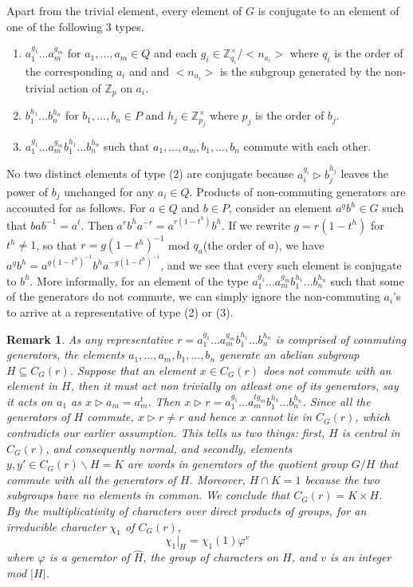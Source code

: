 \documentclass[11pt]{book}
\theoremstyle{Rem}
\newtheorem{Rem}[theorem]{Remark}
\theoremstyle{definition}
\numberwithin{equation}{section}
\newcommand\hit{\triangleright}
\newcommand\inv{^{-1}}
\newcommand\ZZ{\mathbb Z}
\newcommand{\qb}{q_a}
\begin{document}
Apart from the trivial element, every element of $G$ is conjugate to an element of one of the following 3 types.\begin{enumerate}
\item $a_1^{g_1}\dots a_m^{g_m}$ for $a_1,\dots , a_m\in Q$ and each $g_i \in \ZZ_{q_i}^\times/<n_{a_i}> $ where $q_i$ is the order of the corresponding $a_i$ and and $<n_{a_i}>$ is the subgroup generated by the non-trivial action of $\ZZ_p$ on $a_i$.
\item $ b_1^{h_1}\dots b_n^{h_n} $ for $b_1,\dots , b_n\in P$ and $h_j \in \ZZ_{p_j}^\times$ where $p_j$ is the order of $b_j$. 
\item $ a_1^{g_1}\dots a_m^{g_m}b_1^{h_1}\dots b_n^{h_n} $ such that $a_1,\dots , a_m, b_1,\dots , b_n $ commute with each other. \end{enumerate}
No two distinct elements of type (2) are conjugate because $a_i^{g_i}\hit b_j^{h_j}$ leaves the power of $b_j$ unchanged for any $a_i \in Q$. Products of non-commuting generators are accounted for as follows. For $a \in Q$ and $b\in P$, consider an element $a^gb^h \in G$ such that $bab\inv = a^t$. Then $a^rb^ha^{-r} = a^{r(1-t^h)}b^h$. If we rewrite $g= r(1-t^h)$ for $t^h\neq 1$, so that $r =g(1-t^h)\inv$ mod $\qb$(the order of $a$), we have $a^gb^h = a^{g(1-t^h)\inv}b^ha^{-g(1-t^h)\inv}$, and we see that every such element is conjugate to $b^h$. More informally, for an element of the type $ a_1^{g_1}...a_m^{g_m}b_1^{h_1}...b_n^{h_n} $ such that some of the generators do not commute, we can simply ignore the non-commuting $a_i$'s to arrive at a representative of type (2) or (3).
\begin{Rem}\label{char}\rm As any representative $r= a_1^{g_1}...a_m^{g_m}b_1^{h_1}...b_n^{h_n}$ is comprised of commuting generators, the elements $a_1,...,a_m,b_1,...,b_n$ generate an abelian subgroup  $H\subseteq C_G(r)$. Suppose that  an  element $x\in C_G(r)$ does not commute with an element in $H$, then it must act non trivially on atleast one of its generators, say it acts on $a_1$ as $x\hit a_m = a_m^t$. Then $x\hit r = a_1^{g_1}...a_m^{tg_m}b_1^{h_1}...b_n^{h_n}$. Since all the generators of $H$ commute, $x\hit r \neq r$  and hence $x$ cannot lie in $C_G(r)$, which contradicts our earlier assumption. This tells us two things: first, $H$ is central in $C_G(r)$, and consequently normal, and secondly, elements $y, y' \in C_G(r)\backslash H = K$  are words in generators of the quotient group $G/H$ that commute with all the generators of $H$. Moreover, $H\cap K = 1$ because the two subgroups have no elements in common.  We conclude that $C_G(r)= K\times H$. \\
By the multiplicativity of characters over direct products of groups,  for an irreducible character $\chi_1$ of $C_G(r)$, \begin{equation}
	\chi_1|_{H} = \chi_1(1)\varphi^v
\end{equation} where $\varphi$ is a generator of $\hat{H}$, the group of characters on $H$, and $v$ is an integer mod $|H|$.\end{Rem}
\end{document}
